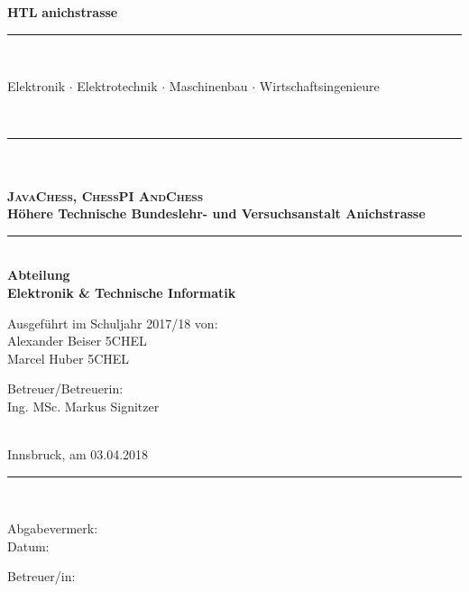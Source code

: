\documentclass[12pt,a4paper]{article}
\begin{document}
\newcommand{\HtlHeader}[0]{%
	\hspace*{-11mm}%
	\raisebox{-1mm}{\logoB{0.12}}%
	\hspace*{2mm}%
	\parbox[b]{110mm}{\flushleft
		{\fontsize{20pt}{20pt}\selectfont\bf HTL}
		{\fontsize{16.2pt}{16.2pt}\selectfont\color{teal}\bf anichstrasse}
		\\[-4.05mm]{\color{darkgray}\rule{110mm}{0.5pt}}
		\\[-2.24mm]{\fontsize{7pt}{7pt}\selectfont\color{darkgray}
			Elektronik $\cdot$ Elektrotechnik $\cdot$
			Maschinenbau $\cdot$ Wirtschaftsingenieure
			\rule{0pt}{0mm}
		}
	}%
	\hspace*{5mm}%
	\\[-1.5mm]\rule{\textwidth}{0.5pt}
}%







\begin{titlepage}
 \begin{center}
   \begin{minipage}{\linewidth}
   \begin{center}
   \HtlHeader{}
	\vspace*{-10mm}
	{\fontsize{25pt}{25pt}\selectfont\bf \\[10mm]}
	\\[19mm]{\fontsize{20pt}{20pt}\selectfont\textbf{\textsc{JavaChess, ChessPI AndChess}}}
	\\[15mm]{\fontsize{12.4pt}{12.4pt}\selectfont\bf
		Höhere Technische Bundeslehr- und Versuchsanstalt Anichstrasse}
	\\[ 5mm]\rule{132mm}{1.0pt}
	\\[ 4mm]{\fontsize{12.4pt}{12.4pt}\selectfont\bf Abteilung}
	\\[ 5mm]{\fontsize{12.4pt}{12.4pt}\selectfont\bf Elektronik \& Technische Informatik}
	\\[24mm]{\hspace*{2mm}\parbox{154mm}{\fontsize{12.4pt}{12.4pt}\selectfont
	  \parbox[t]{75mm}{
		Ausgeführt im Schuljahr 2017/18 von:
		\\[5.0mm]Alexander Beiser 5CHEL
		\\[2.5mm]Marcel Huber 5CHEL 
	  }
	  \hspace*{6mm}
	  \parbox[t]{70mm}{
		Betreuer/Betreuerin:
		\\[5.0mm]Ing. MSc. Markus Signitzer
	  }
	  \\[14mm]{Innsbruck, am 03.04.2018}
	  \\[16mm]\rule{150mm}{0.5pt}
	  \\[ 8mm]
	  \parbox[t]{75mm}{
		Abgabevermerk:
		\\[3.25mm]Datum:
	  }
	  \hspace*{6mm}
	  \parbox[t]{50mm}{
		Betreuer/in:
	  }
	}}
   \end{center}\hfill
   \end{minipage}
 \end{center}
\end{titlepage}
\end{document}
